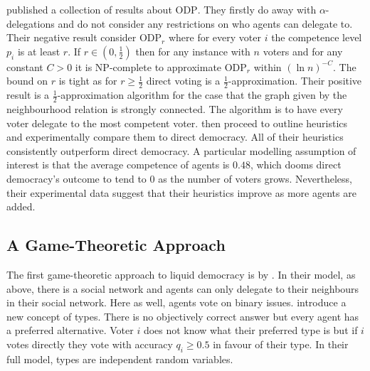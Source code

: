 \documentclass[11pt,a4paper, titlepage]{article}
\theoremstyle{definition}
\begin{document}
\citet{becker2021can} published a collection of results about \textsc{ODP}. 
They firstly do away with $\alpha$-delegations and do not consider any restrictions on who agents can delegate to.
Their negative result consider \textsc{ODP}$_r$ where for every voter $i$ the competence level $p_i$ is at least  $r$.
If $r \in \left(0, \frac{1}{2} \right)$ then for any instance with $n$ voters and for any constant $C > 0$ it is NP-complete to approximate \textsc{ODP}$_r$ within $(\ln n)^{-C}$.
The bound on $r$ is tight as for $r \geq \frac{1}{2}$ direct voting is a $\frac{1}{2}$-approximation.
Their positive result is a $\frac{1}{2}$-approximation algorithm for the case that the graph given by the neighbourhood relation is strongly connected.
The algorithm is to have every voter delegate to the most competent voter.
\citeauthor{becker2021can} then proceed to outline heuristics and experimentally compare them to direct democracy.
All of their heuristics consistently outperform direct democracy.
A particular modelling assumption of interest is that the average competence of agents is $0.48$, which dooms direct democracy's outcome to tend to 0 as the number of voters grows.
Nevertheless, their experimental data suggest that their heuristics improve as more agents are added.

\subsection{A Game-Theoretic Approach}

The first game-theoretic approach to liquid democracy is by \citet{bloembergen2019rational}.
In their model, as above, there is a social network and agents can only delegate to their neighbours in their social network. Here as well, agents vote on binary issues.
\citeauthor{bloembergen2019rational} introduce a new concept of types. 
There is no objectively correct answer but every agent has a preferred alternative.
Voter $i$ does not know what their preferred type is but if $i$ votes directly they vote with accuracy $q_i \geq 0.5$ in favour of their type.
In their full model, types are independent random variables.
\end{document}
